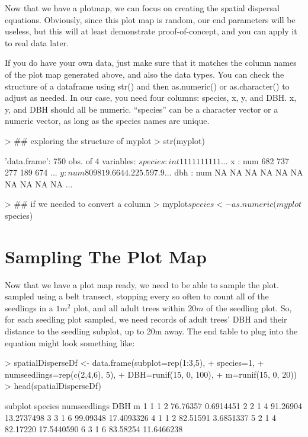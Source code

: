 \documentclass{article}
\begin{document}
Now that we have a plotmap, we can focus on creating the spatial dispersal equations. Obviously, since this plot map is random, our end parameters will be useless, but this will at least demonstrate proof-of-concept, and you can apply it to real data later.

If you do have your own data, just make sure that it matches the column names of the plot map generated above, and also the data types. You can check the structure of a dataframe using str() and then as.numeric() or as.character() to adjust as needed. In our case, you need four columns: species, x, y, and DBH. x, y, and DBH should all be numeric. ``species'' can be a character vector or a numeric vector, as long as the species names are unique.

\begin{Schunk}
\begin{Sinput}
> ## exploring the structure of myplot
> str(myplot)
\end{Sinput}
\begin{Soutput}
'data.frame':	750 obs. of  4 variables:
 $ species: int  1 1 1 1 1 1 1 1 1 1 ...
 $ x      : num  682 737 277 189 674 ...
 $ y      : num  809 819.6 644.2 25.5 97.9 ...
 $ dbh    : num  NA NA NA NA NA NA NA NA NA NA ...
\end{Soutput}
\begin{Sinput}
> ## if we needed to convert a column
> myplot$species <- as.numeric(myplot$species)
\end{Sinput}
\end{Schunk}


\section{Sampling The Plot Map}

Now that we have a plot map ready, we need to be able to sample the plot.  \citet{Ribbens1994} sampled using a belt transect, stopping every so often to count all of the seedlings in a $1 m^2$ plot, and all adult trees within $20m$ of the seedling plot. So, for each seedling plot sampled, we need records of adult trees' DBH and their distance to the seedling subplot, up to 20m away. The end table to plug into the equation might look something like:

\begin{Schunk}
\begin{Sinput}
> spatialDisperseDf <- data.frame(subplot=rep(1:3,5),
+                                 species=1,
+                                 numseedlings=rep(c(2,4,6), 5),
+                                 DBH=runif(15, 0, 100),
+                                 m=runif(15, 0, 20))
> head(spatialDisperseDf)
\end{Sinput}
\begin{Soutput}
  subplot species numseedlings      DBH          m
1       1       1            2 76.76357  0.6914451
2       2       1            4 91.26904 13.2737498
3       3       1            6 99.09348 17.4093326
4       1       1            2 82.51591  3.6851337
5       2       1            4 82.17220 17.5440590
6       3       1            6 83.58254 11.6466238
\end{Soutput}
\end{Schunk}
\end{document}
